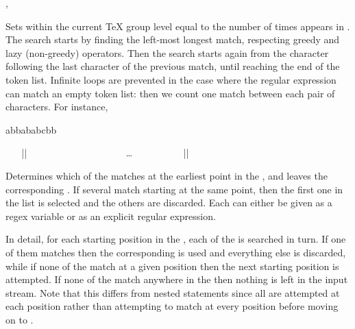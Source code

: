\documentclass[oneside]{book}
\begin{document}
\begin{function}{\RegexCount,\RegexVarCount}
\begin{syntax}
   
   
\end{syntax}
Sets  within the current \TeX{} group level
equal to the number of times
 appears in .
The search starts by finding the left-most longest match,
respecting greedy and lazy (non-greedy) operators. Then the search
starts again from the character following the last character
of the previous match, until reaching the end of the token list.
Infinite loops are prevented in the case where the regular expression
can match an empty token list: then we count one match between each
pair of characters. For instance,
\begin{demohigh}
\IntNew \lFooInt
{} {abbababcbb} \lFooInt
\IntUse \lFooInt
\end{demohigh}
\end{function}

\begin{function}{\RegexMatchCase}
\begin{syntax}
~ ~ |{|
~ ~ ~ ~  
~ ~ ~ ~  
~ ~ ~ ~ \ldots
~ ~ ~ ~  
~ ~ |}| 
\end{syntax}
Determines which of the  matches at the earliest
point in the , and leaves the corresponding .
If several  match starting at the same point,
then the first one in the list is selected and the others are discarded.
Each  can either be given as a regex variable or as an explicit
regular expression.
\par
In detail, for each starting position in the , each
of the  is searched in turn.  If one of them matches
then the corresponding  is used and everything else is
discarded, while if none of the  match at a given
position then the next starting position is attempted.  If none of
the  match anywhere in the  then
nothing is left in the input stream.  Note that this differs from
nested  statements since all  are
attempted at each position rather than attempting to match
 at every position before moving on to .
\end{function}
\end{document}

